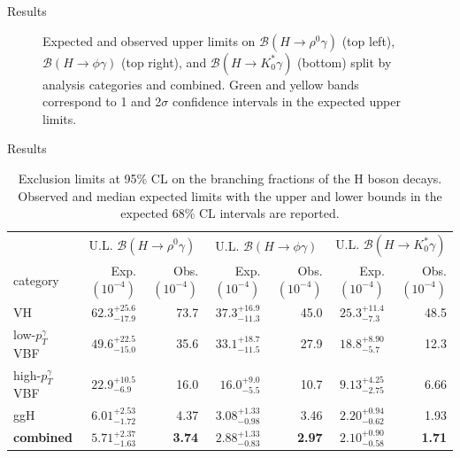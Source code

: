 \documentclass[9pt,aspectratio=1610]{beamer}
\begin{document}
\begin{frame}{Results}
\begin{figure}
\begin{subfigure}{.36\textwidth}
		\end{subfigure}
		\vspace{0.1em}
		\caption{Expected and observed upper limits on $\mathcal{B}(H\rightarrow\rho^0\gamma)$ (top left), $\mathcal{B}(H\rightarrow\phi\gamma)$ (top right), and $\mathcal{B}(H\rightarrow K^*_0\gamma)$ (bottom) split by analysis categories and combined. Green and yellow bands correspond to 1 and 2$\sigma$ confidence intervals in the expected upper limits.}
	\end{figure}
\end{frame}

\begin{frame}{Results}
	\begin{table}
		\centering
		\begin{tabular}{lrrrrrr}
			\hline
			& \multicolumn{2}{c}{U.L. $\mathcal{B}(H\rightarrow \rho^0\gamma)$}  & \multicolumn{2}{c}{U.L. $\mathcal{B}(H\rightarrow \phi\gamma)$} &  \multicolumn{2}{c}{U.L. $\mathcal{B}(H\rightarrow K^*_0\gamma)$}\\ [2ex]
			category & Exp.$(10^{-4})$ & Obs.$(10^{-4})$ & Exp.$(10^{-4})$ & Obs.$(10^{-4})$ & Exp.$(10^{-4})$ & Obs.$(10^{-4})$\\
			\hline
			VH & $62.3^{+25.6}_{-17.9}$ & 73.7 & $37.3^{+16.9}_{-11.3}$ & 45.0 & $25.3^{+11.4}_{-7.3}$ & 48.5 \\[2ex]
			low-$p_T^\gamma$ VBF & $49.6^{+22.5}_{-15.0}$ & 35.6 & $33.1^{+18.7}_{-11.5}$ & 27.9 & $18.8^{+8.90}_{-5.7}$  & 12.3\\[2ex]
			high-$p_T^\gamma$ VBF & $22.9^{+10.5}_{-6.9}$ & 16.0 & $16.0^{+9.0}_{-5.5}$ & 10.7 & $9.13^{+4.25}_{-2.75}$ & 6.66 \\[2ex]
			ggH &$6.01^{+2.53}_{-1.72}$ & 4.37 & $3.08^{+1.33}_{-0.98}$ & 3.46 & $2.20^{+0.94}_{-0.62}$ & 1.93\\ [2ex]
			\cellcolor{orange!50}\textbf{combined} & \cellcolor{orange!50}$5.71^{+2.37}_{-1.63}$ & \cellcolor{orange!50}\textbf{3.74} & \cellcolor{orange!50} $2.88^{+1.33}_{-0.83}$ & \cellcolor{orange!50} \textbf{2.97} & \cellcolor{orange!50}$2.10^{+0.90}_{-0.58}$ & \cellcolor{orange!50}\textbf{1.71} \\[2ex]
			\hline
		\end{tabular}
		\caption{Exclusion limits at 95\% CL on the branching fractions of the H boson decays. Observed and median expected limits with the upper and lower bounds in the expected 68\% CL intervals are reported.}
	\end{table}
\end{frame}
\end{document}
